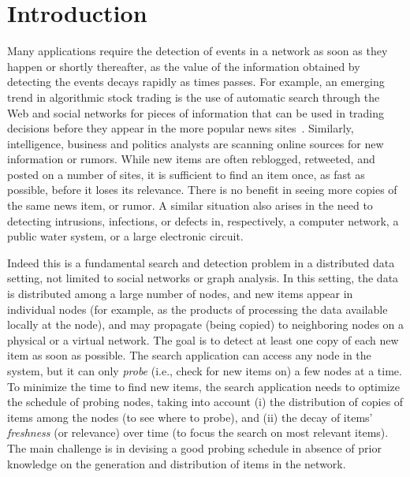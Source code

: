\section{Introduction}\label{sec:introduction}
Many applications require the detection of events in a network as soon as they
happen or shortly thereafter, as the value of the information obtained by
detecting the events decays rapidly as times passes. For example, an emerging
trend in algorithmic stock trading is the use of automatic search through the
Web and social networks for pieces of information that can be used in trading
decisions before they appear in the more popular news
sites~\citep{Delaney2009,ALPHA2014,AlphaFlash,mitra2011handbook,latar2015robot,wallstreet2015,McKinney2011}.
Similarly, intelligence, business and politics analysts are scanning online
sources for new information or rumors. While new items are often reblogged,
retweeted, and posted on a number of sites, it is sufficient to find an item
once, as fast as possible, before it loses its relevance. There is no benefit in
seeing more copies of the same news item, or rumor. A similar situation also
arises in the need to detecting intrusions, infections, or defects in,
respectively, a computer network, a public water system, or a large electronic
circuit.

Indeed this is a fundamental search and detection problem in a distributed data
setting, not limited to social networks or graph analysis. In this setting, the
data is distributed among a large number of nodes, and new items appear in
individual nodes (for example, as the products of processing the data available
locally at the node), and may propagate (being copied) to neighboring nodes on a
physical or a virtual network. The goal is to detect at least one copy of each
new item as soon as possible. The search application can access any node
in the system, but it can only \emph{probe} (i.e., check for new items on) a few
nodes at a time. To minimize the time to find new items, the search application
needs to optimize the schedule of probing nodes, taking into account (i) the
distribution of copies of items among the nodes (to see where to probe), and
(ii) the decay of items' \emph{freshness} (or relevance) over time (to focus the
search on most relevant items). The  main challenge is in devising a good
probing schedule in absence of prior knowledge on the generation and
distribution of items in the network.

